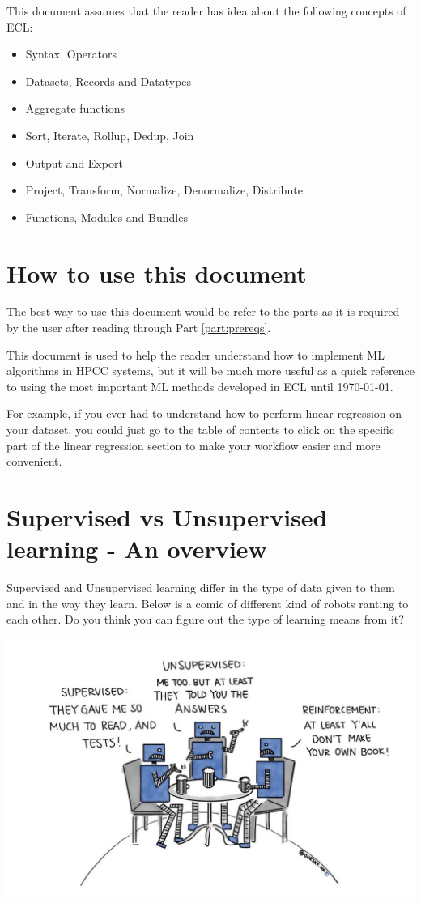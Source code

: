 \documentclass[a4paper,oneside,12pt]{book}
\begin{document}
This document assumes that the reader has idea about the following concepts of ECL:
\begin{itemize}
    \item Syntax, Operators
    \item Datasets, Records and Datatypes
    \item Aggregate functions
    \item Sort, Iterate, Rollup, Dedup, Join
    \item Output and Export
    \item Project, Transform, Normalize, Denormalize, Distribute
    \item Functions, Modules and Bundles
\end{itemize}

\section{How to use this document}\label{sec:howtouse}

The best way to use this document would be refer to the parts as it is required by the user after reading through Part \ref{part:prereqs}.

This document is used to help the reader understand how to implement ML algorithms in HPCC systems, but it will be much more useful as a quick reference to using the most important ML methods developed in ECL until \today.

For example, if you ever had to understand how to perform linear regression on your dataset, you could just go to the table of contents to click on the specific part of the linear regression section to make your workflow easier and more convenient.

\section{Supervised vs Unsupervised learning - An overview}\label{sec:supe_vs_unsupe}

Supervised and Unsupervised learning differ in the type of data given to them and in the way they learn. Below is a comic of different kind of robots ranting to each other. Do you think you can figure out the type of learning means from it?

\includegraphics[width=\textwidth]{../media/intro/learningtypes.jpg}
\end{document}
